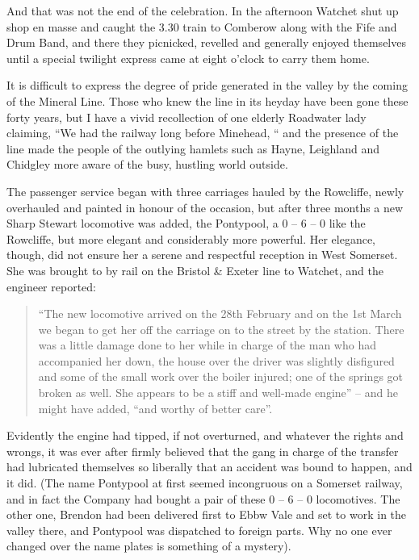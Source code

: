 \documentclass[10pt,a4paper]{article}
\begin{document}
And that was not the end of the celebration. In the afternoon  Watchet shut up shop  en masse and caught the 3.30 train to Comberow along with the Fife and Drum Band, and there they picnicked, revelled and generally enjoyed themselves until a special twilight express  came at eight o’clock to carry them home.

 It is difficult to express the degree of pride generated in the valley by the coming of the Mineral Line. Those who knew the line in its heyday have been gone these forty years, but I have a vivid recollection of one elderly Roadwater lady claiming,  “We had the railway long before Minehead, “ and the presence  of the line made the people of the outlying hamlets such as Hayne, Leighland and Chidgley more aware of the busy, hustling world outside.
 
The passenger service began with three carriages hauled by the Rowcliffe, newly overhauled and painted in honour of the occasion, but after three months a new Sharp Stewart locomotive was added, the Pontypool, a 0 – 6 – 0 like the Rowcliffe, but more elegant and considerably more powerful. Her elegance, though, did not ensure her a serene and respectful reception in West Somerset. She was brought to by rail on the Bristol \& Exeter line to Watchet, and the engineer reported:

\begin{quote}
“The new locomotive arrived on the 28th February and on the 1st March we began to get her off the carriage on to the street by the station. There was a little damage done to her while in charge of the man who had accompanied her down, the house over the driver was slightly disfigured and some of the small work over the boiler  injured; one of the springs got broken as well.  She appears to be a stiff and well-made engine” – and he might have added, “and worthy of better care”.
\end{quote}

Evidently the engine had tipped, if not overturned, and whatever the rights and wrongs, it was ever after firmly believed that the gang in charge of the transfer had lubricated themselves so liberally that an accident was bound to happen, and it did. (The name Pontypool at first seemed incongruous on a Somerset railway, and in fact the Company had bought a pair of these 0 – 6 – 0 locomotives. The other one, Brendon had been delivered first to Ebbw Vale and set to work in the valley there, and Pontypool  was dispatched to foreign parts. Why no one ever changed over the name plates is something of a mystery).
\end{document}
